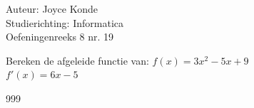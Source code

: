 \documentclass[a4paper]{article}
\begin{document}
  
\noindent \large Auteur: Joyce Konde  \\
\noindent \large Studierichting: Informatica  \\
\noindent \large Oefeningenreeks 8 nr. 19  \\

\medskip

\normalsize

Bereken de afgeleide functie van:   
$f ( x ) = 3 x ^ { 2 } - 5 x + 9$  \\

$f' ( x ) = 6 x - 5$  \\

\begin{thebibliography}{999}
\end{thebibliography}
\end{document}
